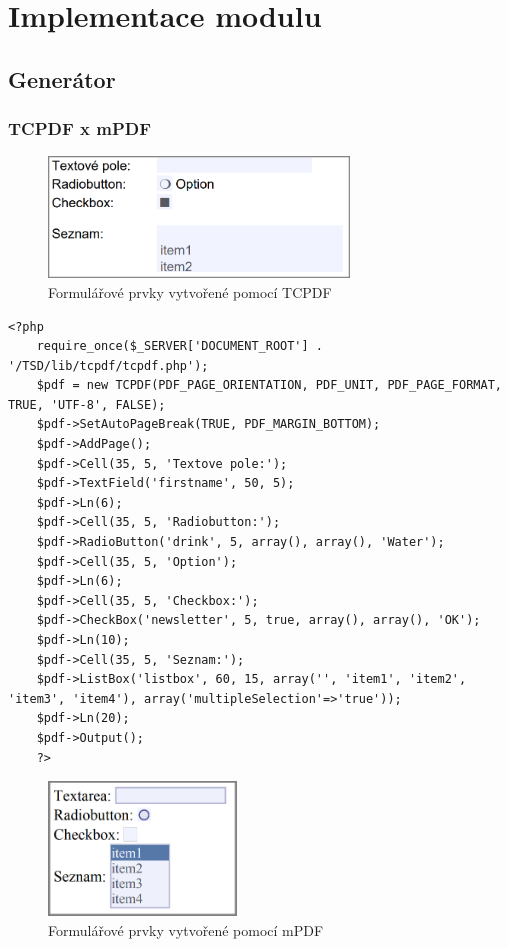 \chapter{Implementace modulu}

\section{Generátor}
\subsection{TCPDF x mPDF}

\begin{figure}[h!]
\centering
\includegraphics[width=8cm]{img/tcpdf_elements}
\caption{Formulářové prvky vytvořené pomocí TCPDF}
\label{fig:tcpdf_elements}
\end{figure}

\begin{lstlisting}[caption = {Zdrojový kód psaný v PHP využívající knihovnu TCPDF}, label = {lst:tcpdf_code}, captionpos=b]
    <?php
    require_once($_SERVER['DOCUMENT_ROOT'] . '/TSD/lib/tcpdf/tcpdf.php');
    $pdf = new TCPDF(PDF_PAGE_ORIENTATION, PDF_UNIT, PDF_PAGE_FORMAT, TRUE, 'UTF-8', FALSE);
    $pdf->SetAutoPageBreak(TRUE, PDF_MARGIN_BOTTOM);
    $pdf->AddPage();
    $pdf->Cell(35, 5, 'Textove pole:');
    $pdf->TextField('firstname', 50, 5);
    $pdf->Ln(6);
    $pdf->Cell(35, 5, 'Radiobutton:');
    $pdf->RadioButton('drink', 5, array(), array(), 'Water');
    $pdf->Cell(35, 5, 'Option');
    $pdf->Ln(6);
    $pdf->Cell(35, 5, 'Checkbox:');
    $pdf->CheckBox('newsletter', 5, true, array(), array(), 'OK');
    $pdf->Ln(10);
    $pdf->Cell(35, 5, 'Seznam:');
    $pdf->ListBox('listbox', 60, 15, array('', 'item1', 'item2', 'item3', 'item4'), array('multipleSelection'=>'true'));
    $pdf->Ln(20);            
    $pdf->Output();
    ?>
\end{lstlisting}

\begin{figure}[h!]
\centering
\includegraphics[width=5cm]{img/mpdf_elements}
\caption{Formulářové prvky vytvořené pomocí mPDF}
\label{fig:mpdf_elements}
\end{figure}

